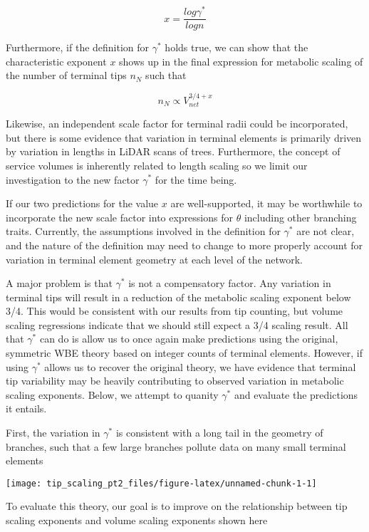 \documentclass[]{article}
\begin{document}
\[x = \frac{log \gamma^{*}}{log n}\]

Furthermore, if the definition for \(\gamma^{*}\) holds true, we can
show that the characteristic exponent \(x\) shows up in the final
expression for metabolic scaling of the number of terminal tips
\(n_{N}\) such that

\[n_{N} \propto V_{net}^{3/4 + x}\]

Likewise, an independent scale factor for terminal radii could be
incorporated, but there is some evidence that variation in terminal
elements is primarily driven by variation in lengths in LiDAR scans of
trees. Furthermore, the concept of service volumes is inherently related
to length scaling so we limit our investigation to the new factor
\(\gamma^{*}\) for the time being.

If our two predictions for the value \(x\) are well-supported, it may be
worthwhile to incorporate the new scale factor into expressions for
\(\theta\) including other branching traits. Currently, the assumptions
involved in the definition for \(\gamma^{*}\) are not clear, and the
nature of the definition may need to change to more properly account for
variation in terminal element geometry at each level of the network.

A major problem is that \(\gamma^{*}\) is not a compensatory factor. Any
variation in terminal tips will result in a reduction of the metabolic
scaling exponent below 3/4. This would be consistent with our results
from tip counting, but volume scaling regressions indicate that we
should still expect a 3/4 scaling result. All that \(\gamma^{*}\) can do
is allow us to once again make predictions using the original, symmetric
WBE theory based on integer counts of terminal elements. However, if
using \(\gamma^{*}\) allows us to recover the original theory, we have
evidence that terminal tip variability may be heavily contributing to
observed variation in metabolic scaling exponents. Below, we attempt to
quanity \(\gamma^{*}\) and evaluate the predictions it entails.

First, the variation in \(\gamma^{*}\) is consistent with a long tail in
the geometry of branches, such that a few large branches pollute data on
many small terminal elements

\texttt{[image: tip\_scaling\_pt2\_files/figure-latex/unnamed-chunk-1-1]}

To evaluate this theory, our goal is to improve on the relationship
between tip scaling exponents and volume scaling exponents shown here
\end{document}
